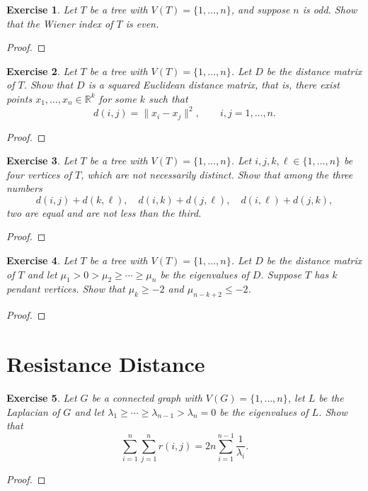 \documentclass[11pt]{article}
\newtheorem{exercise}{Exercise}[section]
\theoremstyle{definition}
\begin{document}
\begin{exercise}
Let $T$ be a tree with $V(T)=\{1,\ldots,n\}$, and suppose $n$ is odd. Show that the Wiener index
of $T$ is even.
\end{exercise}
\begin{proof}
\end{proof}

\begin{exercise}
Let $T$ be a tree with $V(T)=\{1,\ldots,n\}$. Let $D$ be the distance matrix of $T$. Show that
$D$ is a squared Euclidean distance matrix, that is, there exist points
$x_1,\ldots,x_n\in\mathbb{R}^k$ for some $k$ such that
\[
d(i,j)=\|x_i-x_j\|^2,\qquad i,j=1,\ldots,n.
\]
\end{exercise}
\begin{proof}
\end{proof}

\begin{exercise}
Let $T$ be a tree with $V(T)=\{1,\ldots,n\}$. Let $i,j,k,\ell\in\{1,\ldots,n\}$ be four vertices
of $T$, which are not necessarily distinct. Show that among the three numbers
\[
d(i,j)+d(k,\ell),\quad d(i,k)+d(j,\ell),\quad d(i,\ell)+d(j,k),
\]
two are equal and are not less than the third.
\end{exercise}
\begin{proof}
\end{proof}

\begin{exercise}
Let $T$ be a tree with $V(T)=\{1,\ldots,n\}$. Let $D$ be the distance matrix of $T$ and let
$\mu_1>0>\mu_2\ge \cdots \ge \mu_n$ be the eigenvalues of $D$. Suppose $T$ has $k$ pendant vertices.
Show that $\mu_k\ge -2$ and $\mu_{n-k+2}\le -2$.
\end{exercise}
\begin{proof}
\end{proof}

\clearpage
\section{Resistance Distance}

\begin{exercise}
Let $G$ be a connected graph with $V(G)=\{1,\ldots,n\}$, let $L$ be the Laplacian of $G$ and let
$\lambda_1\ge \cdots \ge \lambda_{n-1}>\lambda_n=0$ be the eigenvalues of $L$. Show that
\[
\sum_{i=1}^n\sum_{j=1}^n r(i,j)=2n\sum_{i=1}^{n-1}\frac{1}{\lambda_i}.
\]
\end{exercise}
\begin{proof}
\end{proof}
\end{document}

